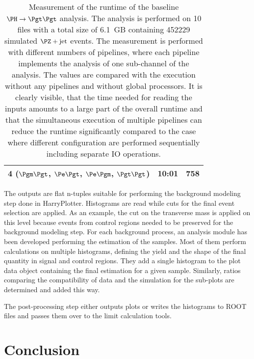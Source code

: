 \documentclass[3p]{elsarticle}
\begin{document}
\begin{table}[h!]
\begin{tabular}{lrr}
 4 ($\Pgm\Pgt$, $\Pe\Pgt$, $\Pe\Pgm$, $\Pgt\Pgt$) & 10:01                            & 758 \\
\bottomrule
\end{tabular}
\caption[Measurement of the runtime of the baseline $\PH\to\Pgt\Pgt$ analysis.]{Measurement of the runtime of the baseline $\PH\to\Pgt\Pgt$ analysis.
The analysis is performed on 10 files with a total size of 6.1~GB containing 452229 simulated $\PZ+\text{jet}$ events.
The measurement is performed with different numbers of pipelines, where each pipeline implements the analysis of one sub-channel of the analysis.
The values are compared with the execution without any pipelines and without global processors.
It is clearly visible, that the time needed for reading the inputs amounts to a large part of the overall runtime and that the simultaneous execution of multiple pipelines can reduce the runtime significantly compared to the case where different configuration are performed sequentially including separate IO operations.}
\label{table_artus_runtime_comparison}
\end{table}

The outputs are flat n-tuples suitable for performing the background modeling step done in HarryPlotter.
Histograms are read while cuts for the final event selection are applied.
As an example, the cut on the transverse mass is applied on this level because events from control regions needed to be preserved for the background modeling step.
For each background process, an analysis module has been developed performing the estimation of the samples.
Most of them perform calculations on multiple histograms, defining the yield and the shape of the final quantity in signal and control regions.
They add a single histogram to the plot data object containing the final estimation for a given sample.
Similarly, ratios comparing the compatibility of data and the simulation for the sub-plots are determined and added this way.

The post-processing step either outputs plots or writes the histograms to ROOT files and passes them over to the limit calculation tools.

\section{Conclusion}
\label{section_conclusion}
\end{document}
